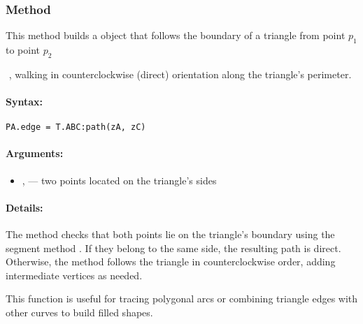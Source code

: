 \subsubsection{Method } %
\label{ssub:method_tkzmeth_triangle_path}

This method builds a  object that follows the boundary of a triangle from point $p_1$ to point $p_2$

​
 , walking in counterclockwise (direct) orientation along the triangle's perimeter.

\paragraph{Syntax:}
\begin{verbatim}
PA.edge = T.ABC:path(zA, zC)
\end{verbatim}

\paragraph{Arguments:}
\begin{itemize}
\item {},  — two points located on the triangle’s sides
\end{itemize}

\paragraph{Details:}
The method checks that both points lie on the triangle’s boundary using the segment method . If they belong to the same side, the resulting path is direct. Otherwise, the method follows the triangle in counterclockwise order, adding intermediate vertices as needed.

This function is useful for tracing polygonal arcs or combining triangle edges with other curves to build filled shapes.


\begin{center}
\end{center}


\endinput
